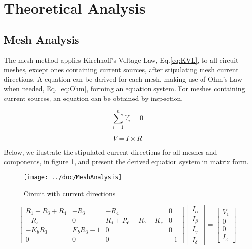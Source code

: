 \section{Theoretical Analysis}
\label{sec:analysis}

\subsection{Mesh Analysis}

\par The mesh method applies Kirchhoff's Voltage Law, Eq.\ref{eq:KVL}, to all circuit meshes, except ones containing current sources, after stipulating mesh current directions. A equation can be derived for each mesh, making use of Ohm's Law when needed, Eq. \ref{eq:Ohm}, forming an equation system. For meshes containing current sources, an equation can be obtained by inspection.

\begin{multicols}{2}
\begin{equation}
    \sum_{i=1}^{n} V_i = 0
    \label{eq:KVL}
\end{equation}

\begin{equation}
    V = I \times R
    \label{eq:Ohm}
\end{equation}
\end{multicols}

Below, we ilustrate the stipulated current directions for all meshes and components, in figure \ref{fig:figmesh}, and present the derived equation system in matrix form.


\begin{figure}[H]
  \centering
  \texttt{[image: ../doc/MeshAnalysis]}
  \caption{Circuit with current directions}
  \label{fig:figmesh}
\end{figure}

\begin{equation*}
\begin{bmatrix} R_1+R_3+R_4 & -R_3 & -R_4 & 0 \\
 -R_4 & 0 & R_4+R_6+R_7-K_c & 0 \\
 -K_bR_3 & K_bR_3-1 & 0 & 0 \\
 0 & 0 & 0 & -1 \end{bmatrix} \begin{bmatrix} I_{\alpha}\\ I_{\beta}\\ I_{\gamma} \\ I_{\delta} \end{bmatrix} = \begin{bmatrix} V_a\\ 0\\ 0\\ I_d \end{bmatrix}
\end{equation*}

